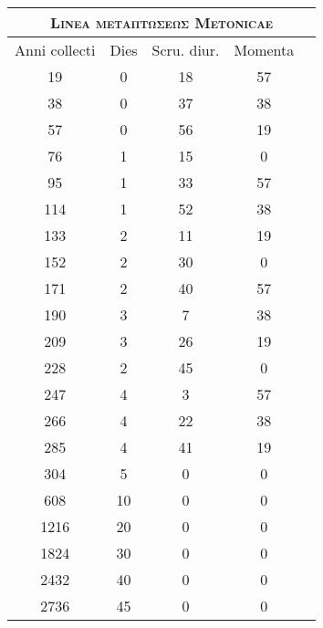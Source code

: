 %
% 
\begin{tabular}{@{}c c c c c@{} }
\toprule
\multicolumn{5}{c}{\Large\textsc{Linea \textgreek{μεταπτώσεως} Metonicae}}\\
\midrule
\multicolumn{1}{c}{Anni collecti} &
\multicolumn{1}{c}{Dies} &
\multicolumn{1}{c}{Scru. diur.} & %
\multicolumn{1}{c}{Momenta}
\\
\midrule
  19 &  0 & 18 & 57 \\
  38 &  0 & 37 & 38 \\
  57 &  0 & 56 & 19 \\
  76 &  1 & 15 &  0 \\
  95 &  1 & 33 & 57 \\
 114 &  1 & 52 & 38 \\
 133 &  2 & 11 & 19 \\
 152 &  2 & 30 &  0 \\
 171 &  2 & 40 & 57 \\
 190 &  3 &  7 & 38 \\
 209 &  3 & 26 & 19 \\
 228 &  2 & 45 &  0 \\
 247 &  4 &  3 & 57 \\
 266 &  4 & 22 & 38 \\
 285 &  4 & 41 & 19 \\
 304 &  5 &  0 &  0 \\
\midrule
 608 & 10 &  0 &  0 \\
1216 & 20 &  0 &  0 \\
1824 & 30 &  0 &  0 \\
2432 & 40 &  0 &  0 \\
2736 & 45 &  0 &  0 \\
\bottomrule
\end{tabular}
% 
%
%